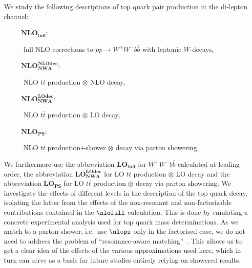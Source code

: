 
We study the following descriptions of top quark pair production in the di-lepton channel:
%
\begin{description}
\item[~~~~~$\mathbf{NLO_{full}}$:]
  full NLO corrections to $pp\to W^+W^- b\bar{b}$ with leptonic $W$-decays,
\item[~~~~~$\mathbf{NLO_{NWA}^{NLOdec}}$:]
  NLO $t\bar{t}$ production $\otimes$ NLO decay,
\item[~~~~~$\mathbf{NLO_{NWA}^{LOdec}}$:]
  NLO $t\bar{t}$ production $\otimes$ LO decay,
\item[~~~~~$\mathbf{NLO_{PS}}$:]
  NLO $t\bar{t}$ production+shower $\otimes$ decay via parton showering.
\end{description}
We furthermore use the abbreviation $\mathbf{LO_{full}}$
for $W^+W^- b\bar{b}$ calculated at leading order, the abbreviation
$\mathbf{LO_{NWA}^{LOdec}}$ for LO $t\bar{t}$ production $\otimes$ LO
decay and the abbreviation $\mathbf{LO_{PS}}$ for LO $t\bar{t}$
production $\otimes$ decay via parton showering.
We investigate the effects of different levels in the description
of the top quark decay,
isolating the latter from the effects of the non-resonant and
non-factorisable contributions contained in the $\nlofull$ calculation.
This is done by emulating a concrete experimental analysis used for top
quark mass determinations.
As we match to a parton shower, i.e.~use $\nlops$ only in the
factorised case, we do not need to address the problem of
``resonance-aware matching''~\cite{Jezo:2016ujg,Frederix:2016rdc}.
This allows us to get a clear idea of the effects of the various
approximations used here, which in turn can serve as a basis for
future studies entirely relying on showered results.


